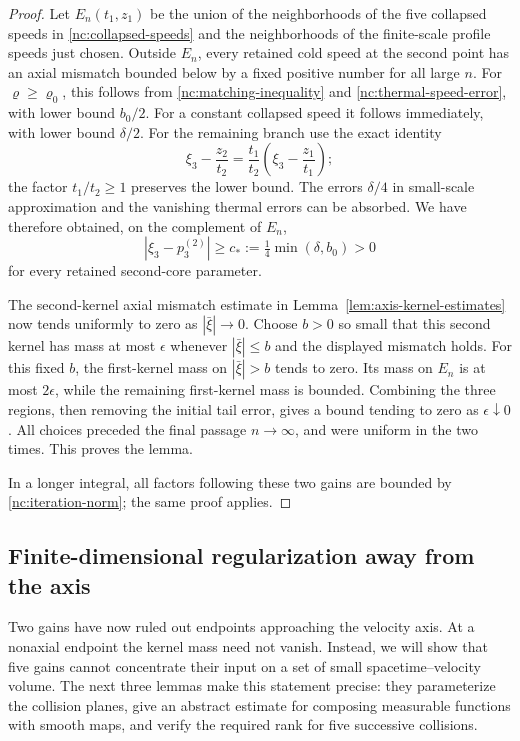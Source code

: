 \begin{proof}
Let \(E_n(t_1,z_1)\) be the union of the neighborhoods of the five
collapsed speeds in \eqref{nc:collapsed-speeds} and the neighborhoods
of the finite-scale profile speeds just chosen.
Outside \(E_n\), every retained cold speed at the second point has
an axial mismatch bounded below by a fixed positive number for
all large \(n\).  For \(\varrho\ge\varrho_0\), this follows from
\eqref{nc:matching-inequality} and
\eqref{nc:thermal-speed-error}, with lower bound \(b_0/2\).
For a constant collapsed speed it follows immediately, with lower
bound \(\delta/2\).  For the remaining branch use the exact identity
\[
 \xi_3-\frac{z_2}{t_2}
 =\frac{t_1}{t_2}
       \left(\xi_3-\frac{z_1}{t_1}\right);
\]
the factor \(t_1/t_2\ge1\) preserves the lower bound.
The errors \(\delta/4\) in small-scale approximation and the
vanishing thermal errors can be absorbed.  We have therefore
obtained, on the complement of \(E_n\),
\[
 |\xi_3-p_3^{(2)}|
 \ge c_*:=\tfrac14\min(\delta,b_0)>0
\]
for every retained second-core parameter.

The second-kernel axial mismatch estimate in
Lemma~\ref{lem:axis-kernel-estimates} now tends uniformly to zero as
\(|\bar\xi|\to0\).  Choose \(b>0\) so small that this second
kernel has mass at most \(\epsilon\) whenever
\(|\bar\xi|\le b\) and the displayed mismatch holds.
For this fixed \(b\), the first-kernel mass on
\(|\bar\xi|>b\) tends to zero.  Its mass on \(E_n\) is at most
\(2\epsilon\), while the remaining first-kernel mass is bounded.
Combining the three regions, then removing the initial tail error,
gives a bound tending to zero as \(\epsilon\downarrow0\).
All choices preceded the final passage \(n\to\infty\), and were
uniform in the two times.  This proves the lemma.

In a longer integral, all factors following these two gains are
bounded by \eqref{nc:iteration-norm}; the same proof applies.
\end{proof}

\subsection{Finite-dimensional regularization away from the axis}

Two gains have now ruled out endpoints approaching the velocity axis.
At a nonaxial endpoint the kernel mass need not vanish. Instead, we
will show that five gains cannot concentrate their input on a set of
small spacetime--velocity volume. The next three lemmas make this
statement precise: they parameterize the collision planes, give an
abstract estimate for composing measurable functions with smooth maps,
and verify the required rank for five successive collisions.

